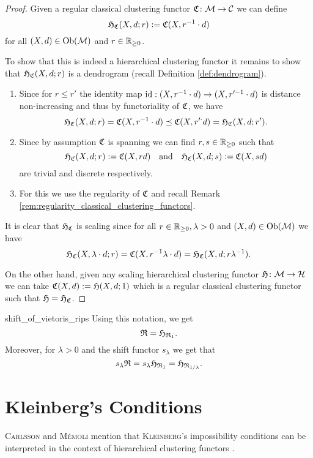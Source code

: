 \begin{proof}
Given a regular classical clustering functor $\mathfrak{C}\colon \mathcal{M} \to \mathcal{C}$ we can define
$$
\mathfrak{H}_{\mathfrak{C}}(X,d; r) := \mathfrak{C}(X, r^{-1} \cdot d)
$$
for all $(X,d) \in \mathrm {Ob}(\mathcal{M})$ and $r \in \mathbb R_{\geq0}$.

To show that this is indeed a hierarchical clustering functor it remains to show that $\mathfrak{H}_{\mathfrak{C}}(X,d;r)$ is a dendrogram (recall Definition \ref{def:dendrogram}).
\begin{enumerate}
    \item Since for $r \leq r'$ the identity map $\mathrm{id}: (X, r^{-1} \cdot d) \to (X, r'^{-1} \cdot d)$ is distance non-increasing and thus by functoriality of $\mathfrak{C}$, we have
    $$
    \mathfrak{H}_{\mathfrak{C}}(X,d;r) = \mathfrak{C}(X, r^{-1} \cdot d) \preceq \mathfrak{C}(X, r'^ \cdot d) = \mathfrak{H}_{\mathfrak{C}}(X,d;r').
    $$
    
    \item Since by assumption $\mathfrak{C}$ is spanning we can find $r,s \in \mathbb R_{\geq0}$ such that
    $$
    \mathfrak{H}_{\mathfrak{C}}(X,d;r) := \mathfrak{C}(X, r d) \quad \text{and} \quad \mathfrak{H}_{\mathfrak{C}}(X,d;s) := \mathfrak{C}(X, s d)
    $$
    are trivial and discrete respectively.

    \item For this we use the regularity of $\mathfrak{C}$ and recall Remark \ref{rem:regularity_classical_clustering_functors}.
\end{enumerate}

It is clear that $\mathfrak{H}_{\mathfrak{C}}$ is scaling since for all $r \in \mathbb R_{\geq0},\lambda > 0$ and $(X,d) \in \mathrm {Ob}(\mathcal{M})$ we have
$$
\mathfrak{H}_{\mathfrak{C}}(X, \lambda \cdot d; r) = \mathfrak{C}(X, r^{-1} \lambda \cdot d) = \mathfrak{H}_{\mathfrak{C}}(X,d;r \lambda^{-1}).
$$ 

On the other hand, given any scaling hierarchical clustering functor $\mathfrak{H}\colon \mathcal{M} \to \mathcal{H}$ we can take $\mathfrak{C}(X,d) := \mathfrak{H}(X,d; 1)$ which is a regular classical clustering functor such that $\mathfrak{H} = \mathfrak{H}_{\mathfrak{C}}$.
\end{proof}

\begin{example}{}{shift_of_vietoris_rips}
Using this notation, we get
$$
\mathfrak{R} = \mathfrak{H}_{\mathfrak{R}_1}.
$$
Moreover, for $\lambda > 0$ and the shift functor $s_\lambda$ we get that
$$
s_\lambda \mathfrak{R} = s_\lambda \mathfrak{H}_{\mathfrak{R}_1} = \mathfrak{H}_{\mathfrak{R}_{1/\lambda}}.
$$
\end{example}

\section{Kleinberg's Conditions}

\textsc{Carlsson} and \textsc{M\'emoli} mention that \textsc{Kleinberg}'s impossibility conditions can be interpreted in the context of hierarchical clustering functors \cite[Sec.~7.3.1]{Carlsson2010}.

